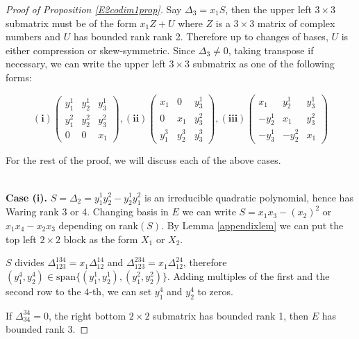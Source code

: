 \documentclass[10pt]{article} %
\theoremstyle{definition}
\begin{document}
\begin{proof}[Proof of Proposition \ref{E2codim1prop}]
Say $\Delta_3=x_1S$, then the upper left $3\times 3$ submatrix must be of the form $x_1Z+U$ where $Z$ is a $3\times3$ matrix of complex numbers and $U$ has bounded rank rank 2. Therefore up to changes of bases, $U$ is either compression or skew-symmetric. Since $\Delta_3\neq0$, taking transpose if necessary, we can write the upper left $3\times 3$ submatrix as one of the following forms:

$$\mathbf{(i)}\begin{pmatrix}
y^1_1 & y^1_2 & y^1_3\\
y^2_1 & y^2_2 & y^2_3\\
0 & 0 & x_1
\end{pmatrix},
\mathbf{(ii)}\begin{pmatrix}
x_1 & 0 & y^1_3\\
0 & x_1 & y^2_3\\
y^3_1 & y^3_2 & y^3_3
\end{pmatrix},
\mathbf{(iii)}\begin{pmatrix}
x_1 & y^1_2 & y^1_3\\
-y^1_2 & x_1 & y^2_3\\
-y^1_3 & -y^2_2 & x_1
\end{pmatrix}$$

For the rest of the proof, we will discuss each of the above cases.

~\\\textbf{Case (i).} $S=\Delta_{2}=y^1_1y^2_2-y^1_2y^2_1$ is an irreducible quadratic polynomial, hence has Waring rank 3 or 4. Changing basis in $E$ we can write $S=x_1x_3-(x_2)^2$ or $x_1x_4-x_2x_3$ depending on rank$(S)$. By Lemma \ref{appendixlem} we can put the top left $2\times2$ block as the form $X_1$ or $X_2$.

$S$ divides $\Delta^{134}_{123}=x_1\Delta^{14}_{12}$ and $\Delta^{234}_{123}=x_1\Delta^{24}_{12}$, therefore $(y^4_1,y^4_2)\in\mathrm{span}\{(y^1_1,y^1_2),(y^2_1,y^2_2)\}$. Adding multiples of the first and the second row to the $4$-th, we can set $y^4_1$ and $y^4_2$ to zeros.

If $\Delta^{34}_{34}=0$, the right bottom $2\times 2$ submatrix has bounded rank 1, then $E$ has bounded rank 3.


\end{proof}
\end{document}
